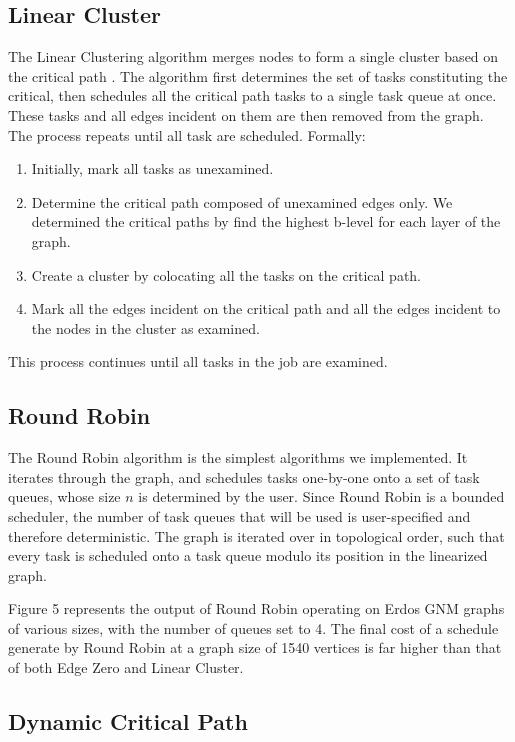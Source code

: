 \documentclass[11pt, oneside]{article}   	%
\begin{document}
\subsection{Linear Cluster}

The Linear Clustering algorithm merges nodes to form a single cluster based on the critical path \cite{lit-review}\cite{linear-cluster}. The algorithm first determines the set of tasks constituting the critical, then schedules all the critical path tasks to a single task queue at once. These tasks and all edges incident on them are then removed from the graph. The process repeats until all task are scheduled. Formally:

\begin{enumerate}
\item Initially, mark all tasks as unexamined.
\item Determine the critical path composed of unexamined edges only. We determined the critical paths by find the highest b-level for each layer of the graph.
\item Create a cluster by colocating all the tasks on the critical path.
\item Mark all the edges incident on the critical path and all the edges incident to the
nodes in the cluster as examined.
\end{enumerate}

This process continues until all tasks in the job are examined.

\subsection{Round Robin}

The Round Robin algorithm is the simplest algorithms we implemented. It iterates through the graph, and schedules tasks one-by-one onto a set of task queues, whose size $n$ is determined by the user. Since Round Robin is a bounded scheduler, the number of task queues that will be used is user-specified and therefore deterministic. The graph is iterated over in topological order, such that every task is scheduled onto a task queue modulo its position in the linearized graph.

Figure 5 represents the output of Round Robin operating on Erdos GNM graphs of various sizes, with the number of queues set to 4. The final cost of a schedule generate by Round Robin at a graph size of 1540 vertices is far higher than that of both Edge Zero and Linear Cluster.

\subsection{Dynamic Critical Path}
\end{document}
